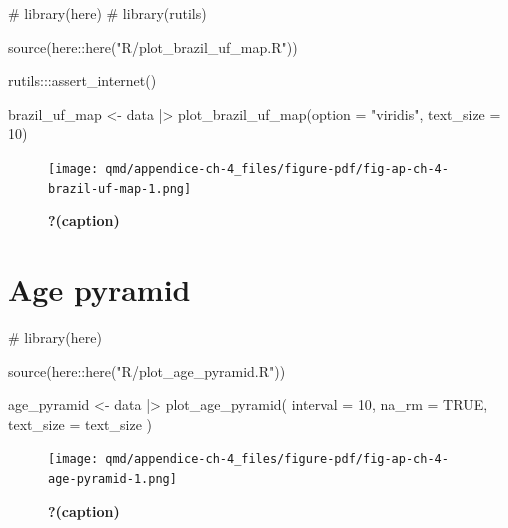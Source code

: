 \documentclass[
  12pt,
  a4paper,
  oneside]{tesesusp}
\newenvironment{Shaded}{\begin{snugshade}}{\end{snugshade}}
\newcommand{\AttributeTok}[1]{\textcolor[rgb]{0.40,0.45,0.13}{#1}}
\newcommand{\CommentTok}[1]{\textcolor[rgb]{0.37,0.37,0.37}{#1}}
\newcommand{\ConstantTok}[1]{\textcolor[rgb]{0.56,0.35,0.01}{#1}}
\newcommand{\DecValTok}[1]{\textcolor[rgb]{0.68,0.00,0.00}{#1}}
\newcommand{\FunctionTok}[1]{\textcolor[rgb]{0.28,0.35,0.67}{#1}}
\newcommand{\NormalTok}[1]{\textcolor[rgb]{0.00,0.23,0.31}{#1}}
\newcommand{\OtherTok}[1]{\textcolor[rgb]{0.00,0.23,0.31}{#1}}
\newcommand{\SpecialCharTok}[1]{\textcolor[rgb]{0.37,0.37,0.37}{#1}}
\newcommand{\StringTok}[1]{\textcolor[rgb]{0.13,0.47,0.30}{#1}}
\begin{document}
\begin{Shaded}
\begin{Highlighting}[numbers=left,,]
\CommentTok{\# library(here)}
\CommentTok{\# library(rutils)}

\FunctionTok{source}\NormalTok{(here}\SpecialCharTok{::}\FunctionTok{here}\NormalTok{(}\StringTok{"R/plot\_brazil\_uf\_map.R"}\NormalTok{))}

\NormalTok{rutils}\SpecialCharTok{:::}\FunctionTok{assert\_internet}\NormalTok{()}

\NormalTok{brazil\_uf\_map }\OtherTok{\textless{}{-}} 
\NormalTok{  data }\SpecialCharTok{|\textgreater{}} 
  \FunctionTok{plot\_brazil\_uf\_map}\NormalTok{(}\AttributeTok{option =} \StringTok{"viridis"}\NormalTok{, }\AttributeTok{text\_size =} \DecValTok{10}\NormalTok{)}
\end{Highlighting}
\end{Shaded}

\begin{figure}[H]

\caption{\label{fig-ap-ch-4-brazil-uf-map}\textbf{?(caption)}}

{\centering \texttt{[image: qmd/appendice-ch-4\_files/figure-pdf/fig-ap-ch-4-brazil-uf-map-1.png]}

}

\end{figure}

\hypertarget{age-pyramid}{%
\section{Age pyramid}\label{age-pyramid}}

\begin{Shaded}
\begin{Highlighting}[numbers=left,,]
\CommentTok{\# library(here)}

\FunctionTok{source}\NormalTok{(here}\SpecialCharTok{::}\FunctionTok{here}\NormalTok{(}\StringTok{"R/plot\_age\_pyramid.R"}\NormalTok{))}

\NormalTok{age\_pyramid }\OtherTok{\textless{}{-}} 
\NormalTok{  data }\SpecialCharTok{|\textgreater{}} 
  \FunctionTok{plot\_age\_pyramid}\NormalTok{(}
    \AttributeTok{interval =} \DecValTok{10}\NormalTok{, }
    \AttributeTok{na\_rm =} \ConstantTok{TRUE}\NormalTok{, }
    \AttributeTok{text\_size =}\NormalTok{ text\_size}
\NormalTok{  )}
\end{Highlighting}
\end{Shaded}

\begin{figure}[H]

\caption{\label{fig-ap-ch-4-age-pyramid}\textbf{?(caption)}}

{\centering \texttt{[image: qmd/appendice-ch-4\_files/figure-pdf/fig-ap-ch-4-age-pyramid-1.png]}

}

\end{figure}
\end{document}
